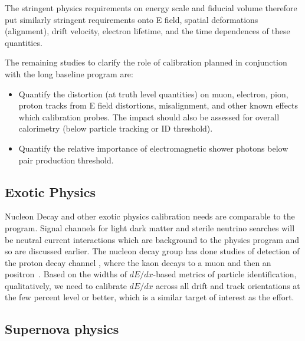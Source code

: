 The stringent physics requirements on energy scale and fiducial volume therefore put similarly stringent requirements onto E field, spatial deformations (alignment), drift velocity, electron lifetime, and the time dependences of these quantities.

The remaining studies to clarify the role of calibration planned in conjunction with the long baseline program are:
\begin{itemize}
\item Quantify the distortion (at truth level quantities) on muon, electron, pion, proton tracks from E field distortions, misalignment, and other known effects which calibration probes. The impact should also be assessed for overall calorimetry (below particle tracking or ID threshold). 
\item Quantify the relative importance of electromagnetic shower photons below pair production threshold. %

\end{itemize}

\subsection{Exotic Physics}\label{sec:exotica}

Nucleon Decay and other exotic physics calibration needs are comparable to the  program.
 Signal channels for light dark matter and sterile neutrino searches will be neutral current interactions which are background to the  physics program and so are discussed earlier.  The nucleon decay group has done studies of detection of the proton decay channel \ptoknubar, %
 where the kaon decays to a muon and then an positron~\cite{protondecaywidths}. Based on the widths of $dE/dx$-based metrics of particle identification, qualitatively, we need to calibrate $dE/dx$ across all drift and track orientations at the few percent level or better, which is a similar target of interest as the  effort.

\subsection{Supernova physics }
\label{sec:sn}

